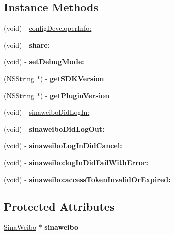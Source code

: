 \subsection*{Instance Methods}
\begin{DoxyCompactItemize}
\item 
(void) -\/ \hyperlink{interfaceShareWeibo_a49d47e5f627464faf1b0afb39d2c984f}{config\+Developer\+Info\+:}
\item 
\mbox{\label{interfaceShareWeibo_a45d780712ad873c273aab20f10c04a58}} 
(void) -\/ {\bfseries share\+:}
\item 
\mbox{\label{interfaceShareWeibo_a709e8817b5bc148661410e945b6ef8c6}} 
(void) -\/ {\bfseries set\+Debug\+Mode\+:}
\item 
\mbox{\label{interfaceShareWeibo_a9b3ce278b064a2d2c6e339c109c01141}} 
(N\+S\+String $\ast$) -\/ {\bfseries get\+S\+D\+K\+Version}
\item 
\mbox{\label{interfaceShareWeibo_a88e5cf0ceaef278c0098c53527e741d5}} 
(N\+S\+String $\ast$) -\/ {\bfseries get\+Plugin\+Version}
\item 
(void) -\/ \hyperlink{interfaceShareWeibo_a1bfe49872e9be1d507bdb1157777a721}{sinaweibo\+Did\+Log\+In\+:}
\item 
\mbox{\label{interfaceShareWeibo_a51cd6a1ae6a9f98788c83d1fdf408130}} 
(void) -\/ {\bfseries sinaweibo\+Did\+Log\+Out\+:}
\item 
\mbox{\label{interfaceShareWeibo_a2637c3da389f326563d8641180a27c8e}} 
(void) -\/ {\bfseries sinaweibo\+Log\+In\+Did\+Cancel\+:}
\item 
\mbox{\label{interfaceShareWeibo_ad90bb9f00474f8e8bf3c797adb73c626}} 
(void) -\/ {\bfseries sinaweibo\+:log\+In\+Did\+Fail\+With\+Error\+:}
\item 
\mbox{\label{interfaceShareWeibo_a7015164a79b150971f09321204914892}} 
(void) -\/ {\bfseries sinaweibo\+:access\+Token\+Invalid\+Or\+Expired\+:}
\end{DoxyCompactItemize}
\subsection*{Protected Attributes}
\begin{DoxyCompactItemize}
\item 
\mbox{\label{interfaceShareWeibo_a40088144d3990003b4ccd80bbbb3596f}} 
\hyperlink{interfaceSinaWeibo}{Sina\+Weibo} $\ast$ {\bfseries sinaweibo}
\end{DoxyCompactItemize}
